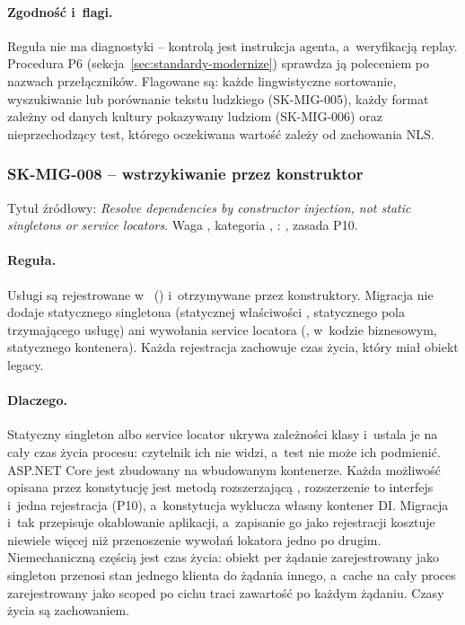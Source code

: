 \paragraph{Zgodność i~flagi.} Reguła nie ma diagnostyki -- kontrolą jest instrukcja agenta,
a~weryfikacją replay. Procedura P6 (sekcja~\ref{sec:standardy-modernize}) sprawdza ją
poleceniem  po nazwach przełączników. Flagowane są: każde lingwistyczne
sortowanie, wyszukiwanie lub porównanie tekstu ludzkiego (SK-MIG-005), każdy format zależny
od danych kultury pokazywany ludziom (SK-MIG-006) oraz nieprzechodzący test, którego
oczekiwana wartość zależy od zachowania NLS.


\subsubsection{SK-MIG-008 -- wstrzykiwanie przez konstruktor}\label{sec:standardy-sk-mig-008}

Tytuł źródłowy: \emph{Resolve dependencies by constructor injection, not static singletons or
service locators}. Waga , kategoria ,
: , zasada P10.

{\raggedright
\paragraph{Reguła.} Usługi są rejestrowane w~
() i~otrzymywane przez konstruktory. Migracja nie dodaje
statycznego singletona (statycznej właściwości , statycznego pola
trzymającego usługę) ani wywołania service locatora
(, 
w~kodzie biznesowym, statycznego  kontenera). Każda rejestracja zachowuje
czas życia, który miał obiekt legacy.\par}

\paragraph{Dlaczego.} Statyczny singleton albo service locator ukrywa zależności klasy
i~ustala je na cały czas życia procesu: czytelnik ich nie widzi, a~test nie może ich
podmienić. ASP.NET Core jest zbudowany na wbudowanym kontenerze. Każda możliwość opisana
przez konstytucję jest metodą rozszerzającą , rozszerzenie to
interfejs i~jedna rejestracja (P10), a~konstytucja wyklucza własny kontener DI. Migracja
i~tak przepisuje okablowanie aplikacji, a~zapisanie go jako rejestracji kosztuje niewiele
więcej niż przenoszenie wywołań lokatora jedno po drugim. Niemechaniczną częścią jest czas
życia: obiekt per żądanie zarejestrowany jako singleton przenosi stan jednego klienta do
żądania innego, a~cache na cały proces zarejestrowany jako scoped po cichu traci zawartość
po każdym żądaniu. Czasy życia są zachowaniem.

